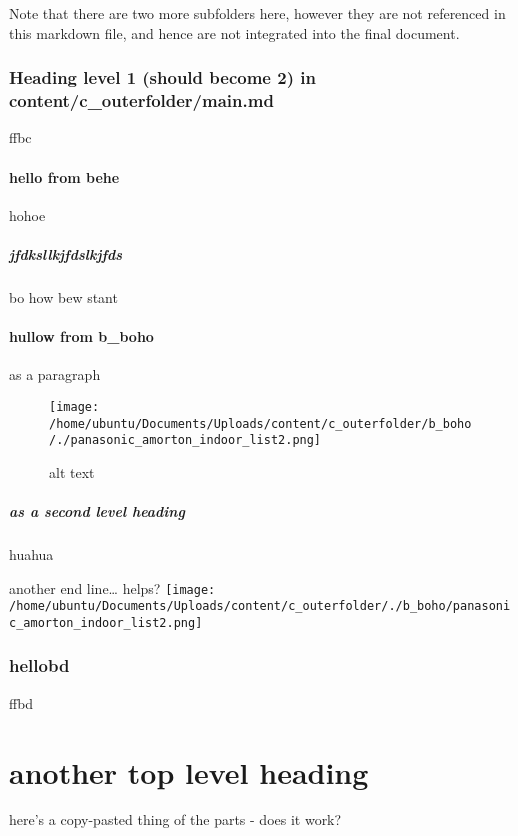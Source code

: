 \documentclass{paper}
\begin{document}
Note that there are two more subfolders here, however they are not
referenced in this markdown file, and hence are not integrated into the
final document.

\hypertarget{heading-level-1-should-become-2-in-contentc_outerfoldermain.md}{%
\section{Heading level 1 (should become 2) in
content/c\_outerfolder/main.md}\label{heading-level-1-should-become-2-in-contentc_outerfoldermain.md}}

ffbc

\hypertarget{hello-from-behe}{%
\subsection{hello from behe}\label{hello-from-behe}}

hohoe

\hypertarget{jfdksllkjfdslkjfds}{%
\subsubsection{jfdksllkjfdslkjfds}\label{jfdksllkjfdslkjfds}}

bo how bew stant

\hypertarget{hullow-from-b_boho}{%
\subsection{hullow from b\_boho}\label{hullow-from-b_boho}}

as a paragraph

\begin{figure}
\centering
\texttt{[image: /home/ubuntu/Documents/Uploads/content/c\_outerfolder/b\_boho/./panasonic\_amorton\_indoor\_list2.png]}
\caption{alt text}
\end{figure}

\hypertarget{as-a-second-level-heading}{%
\subsubsection{as a second level
heading}\label{as-a-second-level-heading}}

huahua

another end line\ldots{} helps?
\texttt{[image: /home/ubuntu/Documents/Uploads/content/c\_outerfolder/./b\_boho/panasonic\_amorton\_indoor\_list2.png]}

\hypertarget{hellobd}{%
\section{hellobd}\label{hellobd}}

ffbd

\part{another top level heading}

here's a copy-pasted thing of the parts - does it work?
\end{document}
